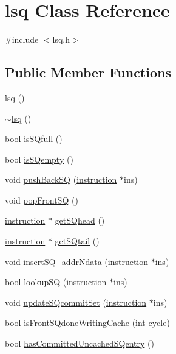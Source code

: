 \hypertarget{classlsq}{
\section{lsq Class Reference}
\label{classlsq}
}


{\ttfamily \#include $<$lsq.h$>$}

\subsection*{Public Member Functions}
\begin{DoxyCompactItemize}
\item 
\hyperlink{classlsq_a7404da6835aa5321a2a5a074b314e944}{lsq} ()
\item 
\hyperlink{classlsq_a430a385f670bea75213f5be7ea0891e4}{$\sim$lsq} ()
\item 
bool \hyperlink{classlsq_afc76def93e0f2ac0c56a92e1dc8d7efd}{isSQfull} ()
\item 
bool \hyperlink{classlsq_a9f240390c165b00ead843f037ab28262}{isSQempty} ()
\item 
void \hyperlink{classlsq_a9a3ea7ed05bbcf12b332a18fc84a317a}{pushBackSQ} (\hyperlink{classinstruction}{instruction} $\ast$ins)
\item 
void \hyperlink{classlsq_aca2f5a9e6e6c483b11eec879cda2100e}{popFrontSQ} ()
\item 
\hyperlink{classinstruction}{instruction} $\ast$ \hyperlink{classlsq_ac9a2a8f09749bd97d5ae525cffbdbda9}{getSQhead} ()
\item 
\hyperlink{classinstruction}{instruction} $\ast$ \hyperlink{classlsq_a286e28a30ce1b7752d5ce9eb0f77d6ae}{getSQtail} ()
\item 
void \hyperlink{classlsq_a9a1d52c28adf6f9b59a82b876a29af53}{insertSQ\_\-addrNdata} (\hyperlink{classinstruction}{instruction} $\ast$ins)
\item 
bool \hyperlink{classlsq_ab0f9350bede75f5dd0f46abd71a3fc20}{lookupSQ} (\hyperlink{classinstruction}{instruction} $\ast$ins)
\item 
void \hyperlink{classlsq_aa78ff1e0d38eabd68022968e8cd31c5d}{updateSQcommitSet} (\hyperlink{classinstruction}{instruction} $\ast$ins)
\item 
bool \hyperlink{classlsq_a4eddb5e00ca783798e83971c467e6017}{isFrontSQdoneWritingCache} (int \hyperlink{vliwScheduler_8cpp_a1f4871d45089b039d95d3832dd123827}{cycle})
\item 
bool \hyperlink{classlsq_a93b8919385546da53590c68cb739838e}{hasCommittedUncachedSQentry} ()

\end{DoxyCompactItemize}
